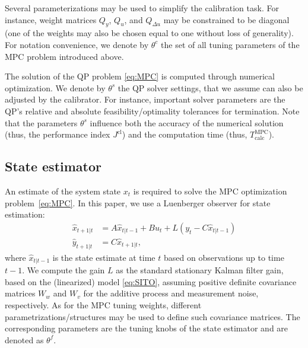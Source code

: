 \documentclass{article}
\newcommand{\TMPC}{T_{\mathrm{s}}^{\mathrm{MPC}}}
\newcommand{\TCALCMPC}{T_{\mathrm{calc}}^{\mathrm{MPC}}}
\newcommand{\JC}{{J^\mathrm{cl}}}
\newtheorem{remark}{Remark}{\normalfont}{\normalfont}
\begin{document}
Several parameterizations may be used to simplify the calibration task. For instance, weight matrices $Q_y$, $Q_u$, and $Q_{\Delta u}$ may be constrained to be diagonal (one of the weights may also be chosen equal to one without loss of generality). %
For notation convenience, we denote by $\theta^c$ the set of all tuning parameters of the MPC problem introduced above.%

The solution of the QP problem \eqref{eq:MPC} is computed through numerical optimization. 
We denote by $\theta^s$ the QP solver settings, that we assume can also be adjusted by the calibrator. For instance, important solver parameters are the QP's relative and absolute
feasibility/optimality tolerances for termination. Note that the parameters $\theta^s$ influence both the accuracy of the numerical solution (thus, the performance index $\JC$) and the computation time (thus, $\TCALCMPC$).

\subsection{State estimator}
An estimate of the system state $x_t$ is required to solve the MPC optimization problem~\eqref{eq:MPC}. In this paper, we use a Luenberger observer for state estimation:
\begin{subequations}
\begin{align}
 \hat x_{t+1|t}   &= A \hat x_{t|t-1} + B u_t + L(y_t - C\hat x_{t|t-1})\\
 \hat y_{t+1|t}  &= C \hat x_{t+1|t},
\end{align}
\end{subequations}
where $\hat x_{t|t-1}$ is the state estimate at time $t$ based on observations up to time $t-1$.
We compute the gain $L$ as the standard stationary Kalman filter gain, based on the (linearized) model \eqref{eq:SITO}, assuming positive definite covariance matrices $W_w$ and $W_v$ for the additive process and measurement noise, respectively.
As for the MPC tuning weights, different parametrizations/structures may be used to 
define such covariance matrices. The corresponding parameters are the tuning knobs of the state estimator and are denoted as $\theta^f$.               
\end{document}
